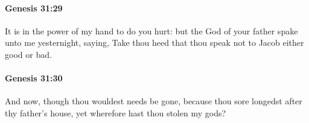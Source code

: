 		\paragraph{Genesis 31:29} %
			\label{GENESIS-31-29}

			It is in the power of my hand to do you hurt: but the God of your father spake unto me yesternight, saying, Take thou heed that thou speak not to Jacob either good or bad.


		\paragraph{Genesis 31:30} %
			\label{GENESIS-31-30}

			And now, though thou wouldest needs be gone, because thou sore longedst after thy father's house, yet wherefore hast thou stolen my gods?


